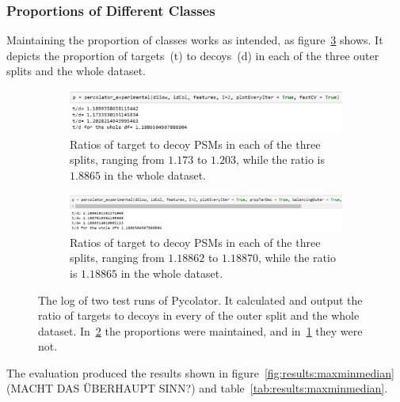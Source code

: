 \subsubsection{Proportions of Different Classes}
\label{lab:results:proportions}
Maintaining the proportion of classes works as intended, as figure~\ref{fig:results:prop_code} shows. It depicts the proportion of targets~(t) to decoys~(d) in each of the three outer splits and the whole dataset.\\
\renewcommand{\baselinestretch}{0.9}
\begin{figure}
	\normalsize
	\centering
	\begin{subfigure}{\textwidth}
		\includegraphics[width = \textwidth]{figures/prop_not_kept_code.jpg}
		\caption{Ratios of target to decoy PSMs in each of the three splits, ranging from $1.173$ to $1.203$, while the ratio is $1.8865$ in the whole dataset.}
		\label{fig:results:prop_not_maintained}
	\end{subfigure}
	\begin{subfigure}{\textwidth}
		\includegraphics[width = \textwidth]{figures/prop_kept_code.jpg}
		\caption{Ratios of target to decoy PSMs in each of the three splits, ranging from $1.18862$ to $1.18870$, while the ratio is $1.18865$ in the whole dataset.}
		\label{fig:results:prop_maintained}
	\end{subfigure}
	\caption[Maintaining proportions works as intended]{The log of two test runs of Pycolator. It calculated and output the ratio of targets to decoys in every of the outer split and the whole dataset. In~\ref{fig:results:prop_maintained} the proportions were maintained, and in~\ref{fig:results:prop_not_maintained} they were not.}
	\label{fig:results:prop_code}
\end{figure}
\renewcommand{\baselinestretch}{1}
The evaluation produced the results shown in figure~\ref{fig:results:maxminmedian} (MACHT DAS ÜBERHAUPT SINN?) and table~\ref{tab:results:maxminmedian}.
\renewcommand{\baselinestretch}{0.9}
